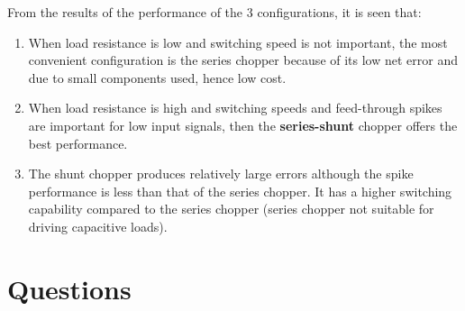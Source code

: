 \documentclass[a4paper,9pt,twoside,openany,twocolumn]{memoir}
\begin{document}
From the results of the performance of the 3 configurations, it is seen that:
\begin{enumerate}
    \item When load resistance is low and switching speed is not important, the most convenient configuration is the series chopper because of its low net error and due to small components used, hence low cost.
    \item When load resistance is high and switching speeds and feed-through spikes are important for low input signals, then the \textbf{series-shunt} chopper offers the best performance.
    \item The shunt chopper produces relatively large errors although the spike performance is less than that of the series chopper. It has a higher switching capability compared to the series chopper (series chopper not suitable for driving capacitive loads).
\end{enumerate}

\section*{Questions}
\end{document}
